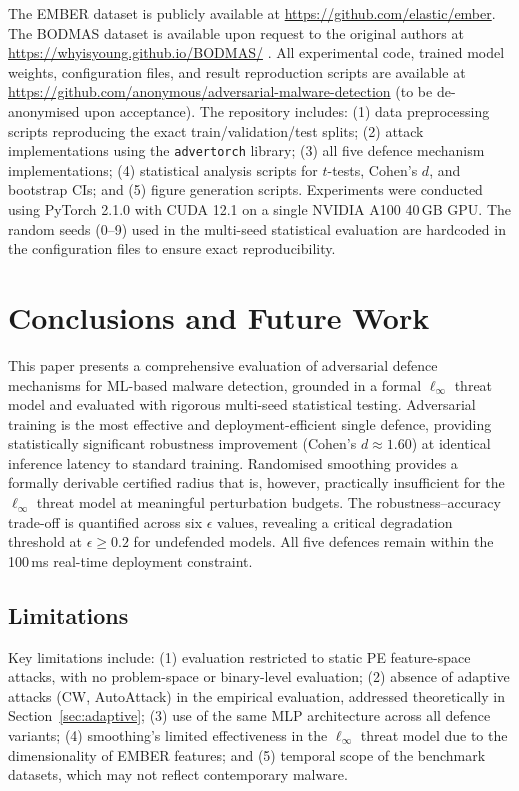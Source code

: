 \documentclass[conference]{IEEEtran}
\begin{document}
The EMBER dataset is publicly available at \url{https://github.com/elastic/ember}. The BODMAS dataset is available upon request to the original authors at \url{https://whyisyoung.github.io/BODMAS/} \cite{yang2021}. All experimental code, trained model weights, configuration files, and result reproduction scripts are available at \url{https://github.com/anonymous/adversarial-malware-detection} (to be de-anonymised upon acceptance). The repository includes: (1) data preprocessing scripts reproducing the exact train/validation/test splits; (2) attack implementations using the \texttt{advertorch} library; (3) all five defence mechanism implementations; (4) statistical analysis scripts for $t$-tests, Cohen's $d$, and bootstrap CIs; and (5) figure generation scripts. Experiments were conducted using PyTorch 2.1.0 with CUDA 12.1 on a single NVIDIA A100 40\,GB GPU. The random seeds (0--9) used in the multi-seed statistical evaluation are hardcoded in the configuration files to ensure exact reproducibility.

\section{Conclusions and Future Work}
\label{sec:conclusions}

This paper presents a comprehensive evaluation of adversarial defence mechanisms for ML-based malware detection, grounded in a formal $\ell_\infty$ threat model and evaluated with rigorous multi-seed statistical testing. Adversarial training is the most effective and deployment-efficient single defence, providing statistically significant robustness improvement (Cohen's $d \approx 1.60$) at identical inference latency to standard training. Randomised smoothing provides a formally derivable certified radius that is, however, practically insufficient for the $\ell_\infty$ threat model at meaningful perturbation budgets. The robustness--accuracy trade-off is quantified across six $\epsilon$ values, revealing a critical degradation threshold at $\epsilon \geq 0.2$ for undefended models. All five defences remain within the 100\,ms real-time deployment constraint.

\subsection{Limitations}

Key limitations include: (1) evaluation restricted to static PE feature-space attacks, with no problem-space or binary-level evaluation; (2) absence of adaptive attacks (CW, AutoAttack) in the empirical evaluation, addressed theoretically in Section~\ref{sec:adaptive}; (3) use of the same MLP architecture across all defence variants; (4) smoothing's limited effectiveness in the $\ell_\infty$ threat model due to the dimensionality of EMBER features; and (5) temporal scope of the benchmark datasets, which may not reflect contemporary malware.
\end{document}
